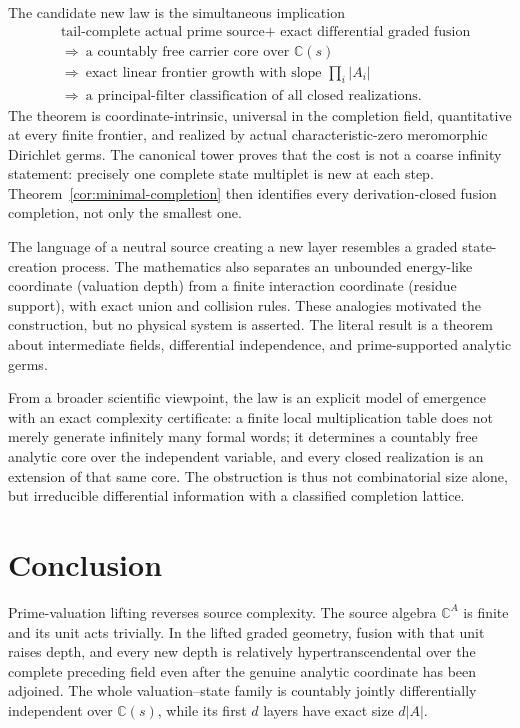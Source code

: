 \documentclass[11pt]{article}
\theoremstyle{definition}
\theoremstyle{remark}
\newcommand{\C}{\mathbb C}
\begin{document}
The candidate new law is the simultaneous implication
\[
\begin{aligned}
&\text{tail-complete actual prime source}
 +\text{ exact differential graded fusion}\\
&\Longrightarrow\ \text{a countably free carrier core over }\C(s)\\
&\Longrightarrow\ \text{exact linear frontier growth with slope }\prod_i|A_i|\\
&\Longrightarrow\ \text{a principal-filter classification of all closed realizations}.
\end{aligned}
\]
The theorem is coordinate-intrinsic, universal in the completion field, quantitative at every
finite frontier, and realized by actual characteristic-zero meromorphic Dirichlet germs.  The
canonical tower proves that the cost is not a coarse infinity statement: precisely one complete
state multiplet is new at each step.  Theorem~\ref{cor:minimal-completion} then identifies every
derivation-closed fusion completion, not only the smallest one.

The language of a neutral source creating a new layer resembles a graded state-creation process.
The mathematics also separates an unbounded energy-like coordinate (valuation depth) from a
finite interaction coordinate (residue support), with exact union and collision rules.  These
analogies motivated the construction, but no physical system is asserted.  The literal result is
a theorem about intermediate fields, differential independence, and prime-supported analytic
germs.

From a broader scientific viewpoint, the law is an explicit model of emergence with an exact
complexity certificate: a finite local multiplication table does not merely generate infinitely
many formal words; it determines a countably free analytic core over the independent variable,
and every closed realization is an extension of that same core.  The obstruction is thus not
combinatorial size alone, but irreducible differential information with a classified completion
lattice.

\section{Conclusion}

Prime-valuation lifting reverses source complexity.  The source algebra \(\C^A\) is finite and its
unit acts trivially.  In the lifted graded geometry, fusion with that unit raises depth, and every
new depth is relatively hypertranscendental over the complete preceding field even after the
genuine analytic coordinate has been adjoined.  The whole valuation--state family is countably
jointly differentially independent over \(\C(s)\), while its first \(d\) layers have exact size
\(d|A|\).
\end{document}
